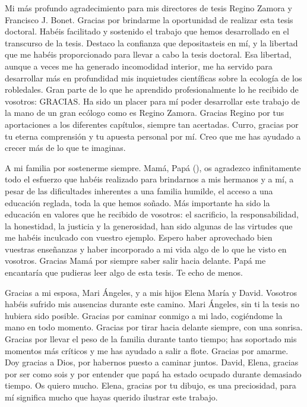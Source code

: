 %
\label{sec:acknowledgement}

\footnotesize
Mi más profundo agradecimiento para mis directores de tesis Regino Zamora y Francisco J. Bonet. Gracias por brindarme la oportunidad de realizar esta tesis doctoral. Habéis facilitado y sostenido el trabajo que hemos desarrollado en el transcurso de la tesis. Destaco la confianza que depositasteis en mí, y la libertad que me habéis proporcionado para llevar a cabo la tesis doctoral. Esa libertad, aunque a veces me ha generado incomodidad interior, me ha servido para desarrollar más en profundidad mis inquietudes científicas sobre la ecología de los robledales. Gran parte de lo que he aprendido profesionalmente lo he recibido de vosotros: GRACIAS. Ha sido un placer para mí poder desarrollar este trabajo de la mano de un gran ecólogo como es Regino Zamora. Gracias Regino por tus aportaciones a los diferentes capítulos, siempre tan acertadas. Curro, gracias por tu eterna comprensión y tu apuesta personal por mí. Creo que me has ayudado a crecer más de lo que te imaginas. 

A mi familia por sostenerme siempre. Mamá, Papá (\dag), os agradezco infinitamente todo el esfuerzo que habéis realizado para brindarnos a mis hermanos y a mí, a pesar de las dificultades inherentes a una familia humilde, el acceso a una educación reglada, toda la que hemos soñado. Más importante ha sido la educación en valores que he recibido de vosotros: el sacrificio, la responsabilidad, la honestidad, la justicia y la generosidad, han sido algunas de las virtudes que me habéis inculcado con vuestro ejemplo. Espero haber aprovechado bien vuestras enseñanzas y haber incorporado a mi vida algo de lo que he visto en vosotros. Gracias Mamá por siempre saber salir hacia delante. Papá me encantaría que pudieras leer algo de esta tesis. Te echo de menos. 

Gracias a mi esposa, Mari Ángeles, y a mis hijos Elena María y David. Vosotros habéis sufrido mis ausencias durante este camino. Mari Ángeles, sin ti la tesis no hubiera sido posible. Gracias por caminar conmigo a mi lado, cogiéndome la mano en todo momento. Gracias por tirar hacia delante siempre, con una sonrisa. Gracias por llevar el peso de la familia durante tanto tiempo; has soportado mis momentos más críticos y me has ayudado a salir a flote. Gracias por amarme. Doy gracias a Dios, por habernos puesto a caminar juntos. David, Elena, gracias por ser como sois y por entender que papá ha estado ocupado durante demasiado tiempo. Os quiero mucho. Elena, gracias por tu dibujo, es una preciosidad, para mí significa mucho que hayas querido ilustrar este trabajo.

